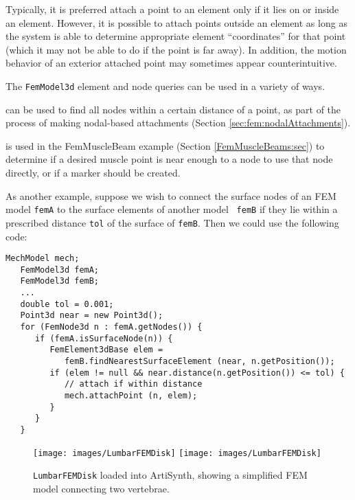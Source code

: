 \begin{sideblock}
Typically, it is preferred attach a point to an element only if it
lies on or inside an element. However, it is possible to attach points
outside an element as long as the system is able to determine
appropriate element ``coordinates'' for that point (which it may not
be able to do if the point is far away). In addition, the motion
behavior of an exterior attached point may sometimes appear
counterintuitive.
\end{sideblock}

The {\tt FemModel3d} element and node queries can be used in a variety
of ways.

can be used to find all nodes within a certain distance of a point, as
part of the process of making nodal-based attachments
(Section \ref{sec:fem:nodalAttachments}).

is used in the FemMuscleBeam example
(Section \ref{FemMuscleBeams:sec}) to determine if a desired muscle
point is near enough to a node to use that node directly, or if a
marker should be created.

As another example, suppose we wish to connect the surface nodes of an
FEM model {\tt femA} to the surface elements of another model {\tt
femB} if they lie within a prescribed distance {\tt tol} of the
surface of {\tt femB}. Then we could use the following code:
%
\begin{lstlisting}[]
   MechModel mech;
   FemModel3d femA;
   FemModel3d femB;
   ...
   double tol = 0.001;
   Point3d near = new Point3d();
   for (FemNode3d n : femA.getNodes()) {
      if (femA.isSurfaceNode(n)) {
         FemElement3dBase elem = 
            femB.findNearestSurfaceElement (near, n.getPosition());
         if (elem != null && near.distance(n.getPosition()) <= tol) {
            // attach if within distance
            mech.attachPoint (n, elem);
         }
      }
   }
\end{lstlisting}
%

\begin{figure}[h]
\begin{center}
\iflatexml
 \texttt{[image: images/LumbarFEMDisk]}
\else
 \texttt{[image: images/LumbarFEMDisk]}
\fi
\end{center}
\caption{{\tt LumbarFEMDisk} loaded into ArtiSynth, showing
a simplified FEM model connecting two vertebrae.}
\label{LumbarFEMDisk:fig}
\end{figure}


